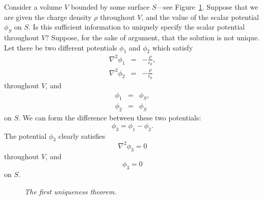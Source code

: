 Consider a volume $V$ bounded by some surface $S$---see Figure~\ref{funq}. Suppose that we are given
the charge density $\rho$ throughout $V$, and the value of the scalar potential
$\phi_S$ on $S$. Is this sufficient information to uniquely specify the scalar
potential throughout $V$? Suppose, for the sake of argument, that the  
solution is not unique. Let there be two different potentials $\phi_1$ and $\phi_2$ which
satisfy
\begin{eqnarray}
\nabla^2 \phi_1 &=& - \frac{\rho}{\epsilon_0}, \\[0.5ex]
\nabla^2 \phi_2 &=& - \frac{\rho}{\epsilon_0}
\end{eqnarray}
throughout $V$, and
\begin{eqnarray}
\phi_1 &=& \phi_S, \\[0.5ex]
 \phi_2 &=& \phi_S
\end{eqnarray}
on $S$. We can form the difference between these two potentials:
\begin{equation}
\phi_3 = \phi_1 - \phi_2.
\end{equation}
The potential $\phi_3$ clearly satisfies
\begin{equation}
\nabla^2\phi_3 = 0
\end{equation}
throughout $V$, and
\begin{equation}
\phi_3 =0 
\end{equation}
on $S$. 
\begin{figure}
\epsfysize=2.25in
\centerline{}
\caption{\em The first uniqueness theorem.}\label{funq}
\end{figure}

